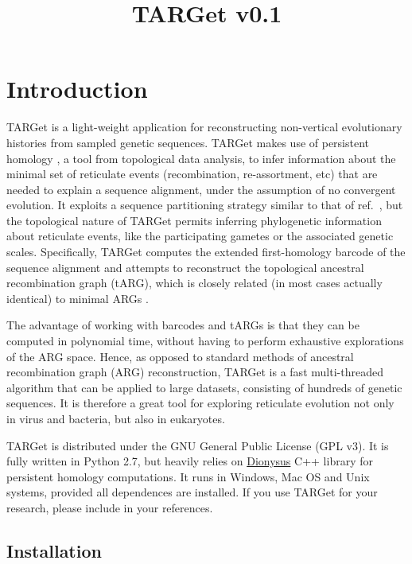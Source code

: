 \documentclass[12pt]{article}
\title{{\LARGE TARGet v0.1}}
\begin{document}
\maketitle

\newpage

\section{Introduction}
\label{sec1}

TARGet is a light-weight application for reconstructing non-vertical evolutionary histories from sampled genetic sequences. TARGet makes use of persistent homology \cite{ph, ph2}, a tool from topological data analysis, to infer information about the minimal set of reticulate events (recombination, re-assortment, etc) that are needed 
to explain a sequence alignment, under the assumption of no convergent evolution. It exploits a sequence partitioning strategy similar to that of ref.~\cite{mg}, but the topological nature of TARGet permits inferring phylogenetic information about reticulate events, like the participating gametes or the associated genetic scales. Specifically, TARGet computes the extended first-homology barcode of the sequence alignment and attempts to reconstruct the topological ancestral recombination graph (tARG), which is closely related (in most cases actually identical) to minimal ARGs \cite{target}. 

The advantage of working with barcodes and tARGs is that they can be computed in polynomial time, without having to perform exhaustive explorations of the ARG space. Hence, as opposed to standard methods of ancestral recombination graph (ARG) reconstruction, TARGet is a fast multi-threaded algorithm that can be applied to large datasets, consisting of hundreds of genetic sequences. It is therefore a great tool for exploring reticulate evolution not only in virus and bacteria, but also in eukaryotes.

TARGet is distributed under the GNU General Public License (GPL v3). It is fully written in Python 2.7, but heavily relies on \href{http://www.mrzv.org/software/dionysus/}{Dionysus} C++ library for persistent homology computations. It runs in Windows, Mac OS and Unix systems, provided all dependences are installed. If you use TARGet for your research, please include \cite{target} in your references. 

\subsection*{Installation}
\end{document}
